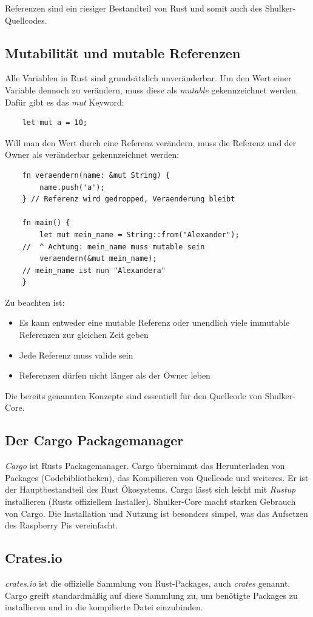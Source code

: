 Referenzen sind ein riesiger Bestandteil von Rust und somit auch des Shulker-Quellcodes.

\subsection{Mutabilität und mutable Referenzen}
Alle Variablen in Rust sind grundsätzlich unveränderbar. Um den Wert einer Variable dennoch zu verändern,
muss diese als \textit{mutable} gekennzeichnet werden. Dafür gibt es das \textit{mut} Keyword:
\begin{lstlisting}
    let mut a = 10;
\end{lstlisting}
Will man den Wert durch eine Referenz verändern, muss die Referenz und der Owner als veränderbar gekennzeichnet werden:
\begin{lstlisting}
    fn veraendern(name: &mut String) {
        name.push('a');
    } // Referenz wird gedropped, Veraenderung bleibt

    fn main() {
        let mut mein_name = String::from("Alexander");
    //  ^ Achtung: mein_name muss mutable sein
        veraendern(&mut mein_name);
    // mein_name ist nun "Alexandera"
    }
\end{lstlisting}
Zu beachten ist:
\begin{itemize}
    \item Es kann entweder eine mutable Referenz oder unendlich viele immutable Referenzen zur gleichen Zeit geben
    \item Jede Referenz muss valide sein
    \item Referenzen dürfen nicht länger als der Owner leben
\end{itemize}
Die bereits genannten Konzepte sind essentiell für den Quellcode von Shulker-Core.

\subsection{Der Cargo Packagemanager}
\textit{Cargo} ist Rusts Packagemanager. Cargo übernimmt das Herunterladen von Packages (Codebibliotheken), das Kompilieren von Quellcode und weiteres.
Er ist der Hauptbestandteil des Rust Ökosystems. Cargo lässt sich leicht mit \textit{Rustup} installieren (Rusts offiziellem Installer). Shulker-Core macht
starken Gebrauch von Cargo. Die Installation und Nutzung ist besonders simpel, was das Aufsetzen des Raspberry Pis vereinfacht.

\subsection{Crates.io}
\textit{crates.io} ist die offizielle Sammlung von Rust-Packages, auch \textit{crates} genannt. Cargo greift standardmäßig auf diese 
Sammlung zu, um benötigte Packages zu installieren und in die kompilierte Datei einzubinden.